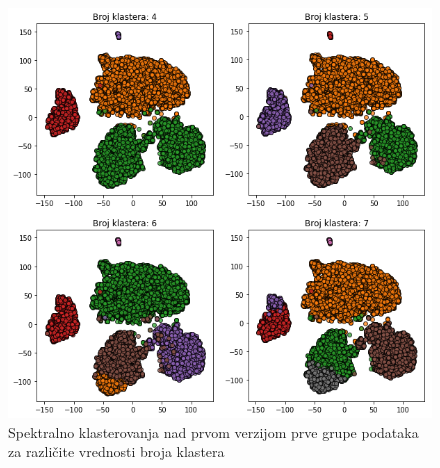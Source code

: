 \documentclass[a4paper]{article}
\begin{document}
\begin{figure}[H]
\centering
\includegraphics[scale=0.6]{spektralno_nmf_vise_klastera}
\caption{Spektralno klasterovanja nad prvom verzijom prve grupe podataka za različite vrednosti broja klastera}
\label{spektralno_nmf_vise_klastera}

\end{figure}
\end{document}
